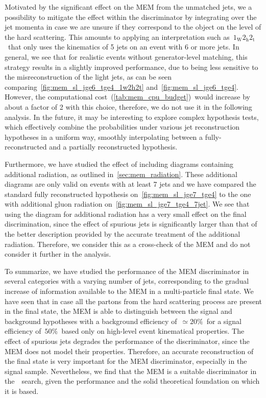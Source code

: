 Motivated by the significant effect on the MEM from the unmatched jets, we a possibility to mitigate the effect within the discriminator by integrating over the jet momenta in case we are unsure if they correspond to the object on the level of the hard scattering. This amounts to applying an interpretation such as~$1_{\mathrm{W}} 2_{\mathrm{h}} 2_{\mathrm{t}}$~that only uses the kinematics of 5 jets on an event with 6 or more jets. In general, we see that for realistic events without generator-level matching, this strategy results in a slightly improved performance, due to being less sensitive to the misreconstruction of the light jets, as can be seen comparing~\cref{fig:mem_sl_jge6_tge4_1w2h2t} and~\cref{fig:mem_sl_jge6_tge4}. However, the computational cost~(\cref{tab:mem_cpu_budget})~would increase by about a factor of 2 with this choice, therefore, we do not use it in the following analysis. In the future, it may be interesting to explore complex hypothesis tests, which effectively combine the probabilities under various jet reconstruction hypotheses in a uniform way, smoothly interpolating between a fully-reconstructed and a partially reconstructed hypothesis.

Furthermore, we have studied the effect of including diagrams containing additional radiation, as outlined in~\cref{sec:mem_radiation}. These additional diagrams are only valid on events with at least 7 jets and we have compared the standard fully reconstructed hypothesis on~\cref{fig:mem_sl_jge7_tge4} to the one with additional gluon radiation on~\cref{fig:mem_sl_jge7_tge4_7jet}. We see that using the diagram for additional radiation has a very small effect on the final discrimination, since the effect of spurious jets is significantly larger than that of the better description provided by the accurate treatment of the additional radiation. Therefore, we consider this as a cross-check of the MEM and do not consider it further in the analysis.

To summarize, we have studied the performance of the MEM discriminator in several categories with a varying number of jets, corresponding to the gradual increase of information available to the MEM in a multi-particle final state. We have seen that in case all the partons from the hard scattering process are present in the final state, the MEM is able to distinguish between the signal and background hypotheses with a background efficiency of~$\simeq 20\%$~for a signal efficiency of~$50\%$~based only on high-level event kinematical properties. The effect of spurious jets degrades the performance of the discriminator, since the MEM does not model their properties. Therefore, an accurate reconstruction of the final state is very important for the MEM discriminator, especially in the signal sample. Nevertheless, we find that the MEM is a suitable discriminator in the~\ttHbb~search, given the performance and the solid theoretical foundation on which it is based.

